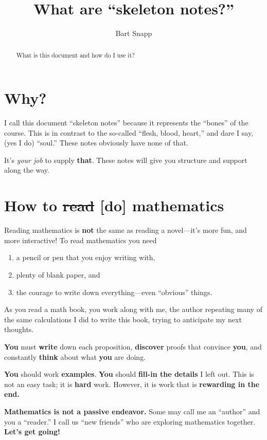 

\author{Bart Snapp}

\title{What are ``skeleton notes?''}

\begin{abstract}
  What is this document and how do I use it?
\end{abstract}
\maketitle


\section{Why?}

I call this document ``skeleton notes'' because it represents the
``bones'' of the course. This is in contrast to the so-called ``flesh,
blood, heart,'' and dare I say, (yes I do) ``soul.''  These notes
obviously have none of that.


It's \textit{your job} to supply \textbf{that}. These notes will give
you structure and support along the way.






\section{How to \sout{read} [do] mathematics}

Reading mathematics is \textbf{not} the same as reading a novel---it's
more fun, and more interactive!  To read mathematics you need
\begin{enumerate}
\item a pencil or pen that you enjoy writing with,
\item plenty of blank paper, and
\item the courage to write down everything---even ``obvious'' things.
\end{enumerate}
As you read a math book, you work along with me, the author repeating
many of the same calculations I did to write this book, trying to
anticipate my next thoughts.


\textbf{You} must \textbf{write} down each proposition, \textbf{discover}
proofs that convince \textbf{you}, and constantly \textbf{think} about what \textbf{you}
are doing.

\textbf{You} should work \textbf{examples}.  \textbf{You} should
\textbf{fill-in the details} I left out.  This is not an easy task; it
is \textbf{hard} work. However, it is work that is \textbf{rewarding in the
  end.}



\textbf{Mathematics is not a passive endeavor.}  Some may call me an ``author''
and you a ``reader.'' I call us ``new friends'' who are exploring
mathematics together. \textbf{Let's get going!}




